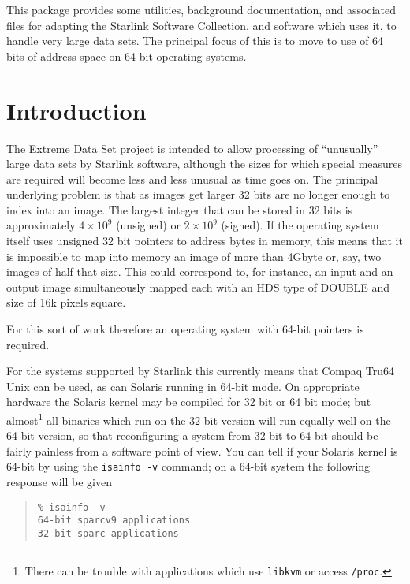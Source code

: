 \documentclass[twoside,11pt]{article}
\newcommand{\stardocinitials}  {SSN}
\newcommand{\stardocnumber}    {73.1 (draft)}
\newcommand{\stardocabstract}  {
This package provides some utilities, background documentation,
and associated files
for adapting the Starlink Software Collection, and software which uses it, 
to handle very large data sets.
The principal focus of this is to move to use of 64 bits of address
space on 64-bit operating systems.
}
\newcommand{\stardocname}{\stardocinitials /\stardocnumber}
\newenvironment{latexonly}{}{}
\renewcommand{\_}{\texttt{\symbol{95}}}
\newcommand{\file}[1]{{\tt #1}}
\newenvironment{squote}{\begin{quote}\begin{small}}{\end{small}\end{quote}}
\renewcommand{\thepage}{\roman{page}}
\begin{document}
\stardocabstract
  \newpage
  \begin{latexonly}
    \setlength{\parskip}{0mm}
    \tableofcontents
    \setlength{\parskip}{\medskipamount}
    \markboth{\stardocname}{\stardocname}
  \end{latexonly}
\cleardoublepage
\renewcommand{\thepage}{\arabic{page}}
\setcounter{page}{1}




\section{Introduction}

The Extreme Data Set project is intended to allow processing of ``unusually''
large data sets by Starlink software, 
although the sizes for which special measures
are required will become less and less unusual as time goes on.
The principal underlying problem is that as images get larger
32 bits are no longer enough to index into an image.
The largest integer that can be stored in 32 bits 
is approximately $4 \times 10^9$ (unsigned) or $2 \times 10^9$ (signed).
If the operating system itself uses unsigned 32 bit pointers to 
address bytes
in memory, this means that it is impossible to map into memory 
an image of more
than 4Gbyte or, say, two images of half that size. 
This could correspond to, for instance, an input and an output image
simultaneously mapped each with an HDS type of \_DOUBLE and 
size of 16k pixels square.

For this sort of work therefore an operating system with 64-bit 
pointers is required.

For the systems supported by
Starlink this currently means that Compaq Tru64 Unix can be used,
as can Solaris running in 64-bit mode.  
On appropriate hardware the Solaris kernel 
may be compiled for 32 bit or 64 bit mode;
but almost\footnote{
   There can be trouble with applications which use 
   \file{libkvm} or access \file{/proc}.}
all binaries which run on the 32-bit version
will run equally well on the 64-bit version, 
so that reconfiguring a system from 32-bit to 64-bit should be
fairly painless from a software point of view.
You can tell if your Solaris kernel is 64-bit 
by using the \file{isainfo -v} command; on a 64-bit system the
following response will be given
\begin{squote}
\begin{verbatim}
% isainfo -v
64-bit sparcv9 applications
32-bit sparc applications
\end{verbatim}
\end{squote}
\end{document}
